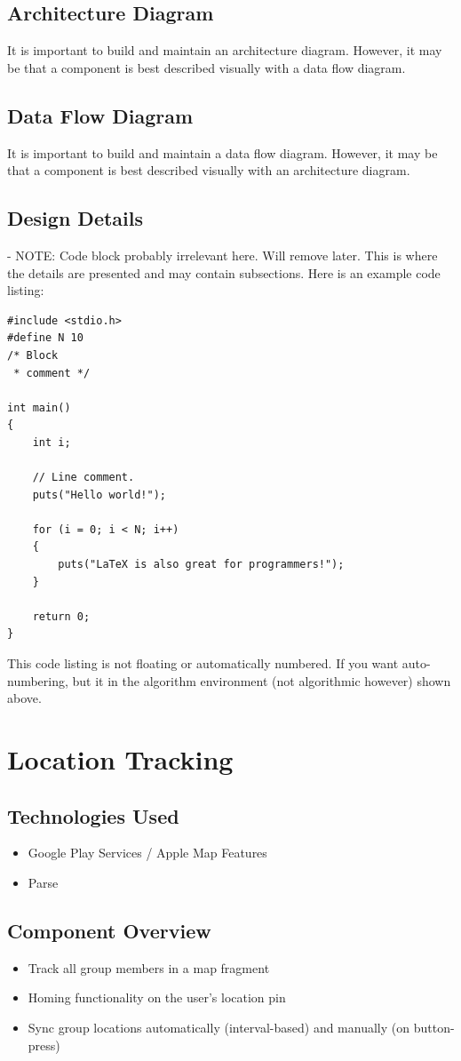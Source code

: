 \subsection{Architecture Diagram}
It is important to build and maintain an architecture diagram.  However, it may 
be that a component is best described visually with a data flow diagram. 

\subsection{Data Flow Diagram}
It is important to build and maintain a data flow diagram.  However, it may be 
that a component is best described visually with an architecture diagram. 

\subsection{Design Details} - NOTE: Code block probably irrelevant here. Will remove later.
This is where the details are presented and may contain subsections.   Here is an example code listing:
\begin{lstlisting}
#include <stdio.h>
#define N 10
/* Block
 * comment */
 
int main()
{
    int i;
 
    // Line comment.
    puts("Hello world!");
 
    for (i = 0; i < N; i++)
    {
        puts("LaTeX is also great for programmers!");
    }
 
    return 0;
}
\end{lstlisting}
This code listing is not floating or automatically numbered.  If you want auto-numbering, but it in the algorithm environment (not algorithmic however) shown above.

\section{Location Tracking }

\subsection{Technologies  Used}
\begin{itemize}
  \item Google Play Services / Apple Map Features
  \item Parse
\end{itemize}

\subsection{Component  Overview}
\begin{itemize}
  \item Track all group members in a map fragment
  \item Homing functionality on the user's location pin
  \item Sync group locations automatically (interval-based) and manually (on button-press)
\end{itemize}

